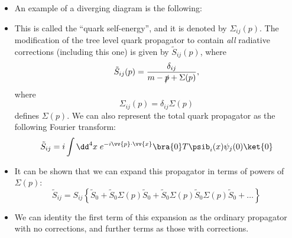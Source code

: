 \begin{itemize}
    \item An example of a diverging diagram is the following:
\end{itemize}

\begin{center}
\end{center}

\begin{itemize}
    \item This is called the ``quark self-energy'', and it is denoted by $\Sigma_{ij}(p)$. The modification of the tree level quark propagator to contain \textit{all} radiative corrections (including this one) is given by $\tilde{S}_{ij}(p)$, where
        \begin{equation}
            \tilde{S}_{ij}(p) = \frac{\delta_{ij}}{m - \slashed{p} + \Sigma(p)},
        \end{equation}
        where 
        \begin{equation}
            \Sigma_{ij}(p) = \delta_{ij} \Sigma(p)\label{SigmaIJ}
        \end{equation}
        defines $\Sigma(p)$. We can also represent the total quark propagator as the following Fourier transform:
        \begin{equation}
            \tilde{S}_{ij} = i\int \dd^4x\; e^{-i \vv{p}\cdot\vv{x}} \bra{0} T \psib_i(x) \psi_j(0) \ket{0}
        \end{equation}
    \item It can be shown that we can expand this propagator in terms of powers of $\Sigma(p)$:
        \begin{equation}
            \tilde{S}_{ij} = S_{ij} \left\{\tilde{S}_0 + \tilde{S}_0 \Sigma(p) \tilde{S}_0 + \tilde{S}_0 \Sigma(p) \tilde{S}_0 \Sigma(p) \tilde{S}_0 + \ldots\right\}
        \end{equation}
    \item We can identity the first term of this expansion as the ordinary propagator with no corrections, and further terms as those with corrections.
\end{itemize}


